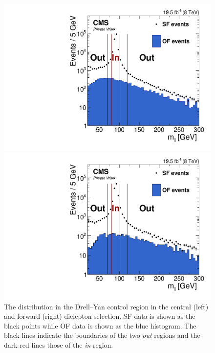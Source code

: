 \begin{figure}[htbp]
\centering
\begin{minipage}[t]{0.49\textwidth}
  \includegraphics[width=\textwidth]{plots/BG/rOutIn/rOutIn_SF_DrellYanControlCentral_Full2012.pdf}
\end{minipage}
\begin{minipage}[t]{0.49\textwidth}
\includegraphics[width=\textwidth]{plots/BG/rOutIn/rOutIn_SF_DrellYanControlForward_Full2012.pdf}
\end{minipage}

\caption{The \mll distribution in the Drell--Yan control region in the central (left) and forward (right) dielepton selection. SF data is shown as the black points while OF data is shown as the blue histogram. The black lines indicate the boundaries of the two \textit{out} regions and the dark red lines those of the \textit{in} region.}
\label{fig:rOutIn}
\end{figure} 
